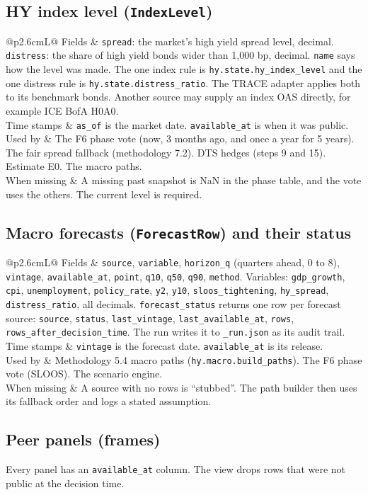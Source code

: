 \documentclass[11pt,a4paper]{article}
\makeatletter
\newcommand{\code}[1]{\texttt{\small #1}}
\newcommand{\kind}[5]{%
\subsection{#1}
\noindent\begin{tabularx}{\linewidth}{@{}p{2.6cm}L@{}}
\toprule
Fields & #2\\\midrule
Time stamps & #3\\\midrule
Used by & #4\\\midrule
When missing & #5\\\bottomrule
\end{tabularx}}
\makeatother
\begin{document}
\kind{HY index level (\code{IndexLevel})}
{\code{spread}: the market's high yield spread level, decimal. \code{distress}: the share of high yield bonds wider
than 1,000 bp, decimal. \code{name} says how the level was made. The one index rule is
\code{hy.state.hy\_index\_level} and the one distress rule is \code{hy.state.distress\_ratio}. The TRACE adapter
applies both to its benchmark bonds. Another source may supply an index OAS directly, for example ICE BofA H0A0.}
{\code{as\_of} is the market date. \code{available\_at} is when it was public.}
{The F6 phase vote (now, 3 months ago, and once a year for 5 years). The fair spread fallback (methodology 7.2). DTS
hedges (steps 9 and 15). Estimate E0. The macro paths.}
{A missing past snapshot is NaN in the phase table, and the vote uses the others. The current level is required.}

\kind{Macro forecasts (\code{ForecastRow}) and their status}
{\code{source}, \code{variable}, \code{horizon\_q} (quarters ahead, 0 to 8), \code{vintage}, \code{available\_at},
\code{point}, \code{q10}, \code{q50}, \code{q90}, \code{method}. Variables: \code{gdp\_growth}, \code{cpi},
\code{unemployment}, \code{policy\_rate}, \code{y2}, \code{y10}, \code{sloos\_tightening}, \code{hy\_spread},
\code{distress\_ratio}, all decimals. \code{forecast\_status} returns one row per forecast source: \code{source},
\code{status}, \code{last\_vintage}, \code{last\_available\_at}, \code{rows}, \code{rows\_after\_decision\_time}. The run
writes it to \code{\_run.json} as its audit trail.}
{\code{vintage} is the forecast date. \code{available\_at} is its release.}
{Methodology 5.4 macro paths (\code{hy.macro.build\_paths}). The F6 phase vote (SLOOS). The scenario engine.}
{A source with no rows is ``stubbed''. The path builder then uses its fallback order and logs a stated assumption.}

\subsection{Peer panels (frames)}
\noindent Every panel has an \code{available\_at} column. The view drops rows that were not public at the decision
time.
\end{document}
